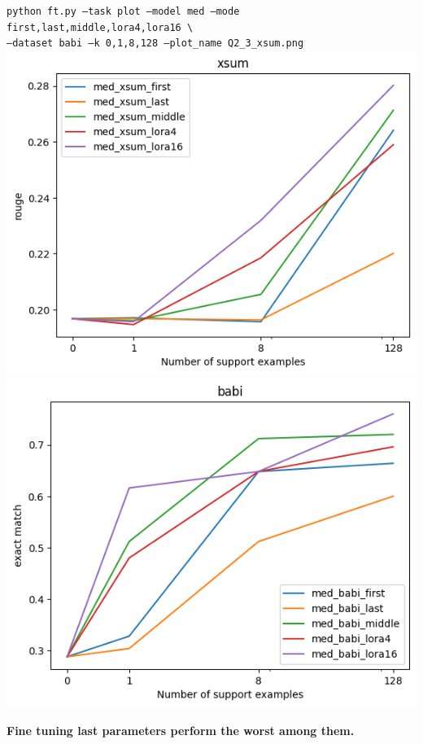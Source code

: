 \documentclass[12pt]{article}
\begin{document}
\begin{enumerate}
            {\small \texttt{python ft.py --task plot --model med --mode first,last,middle,lora4,lora16 \textbackslash \\
        \phantom{asdf}--dataset babi --k 0,1,8,128 --plot\_name Q2\_3\_xsum.png}}\\
        \includegraphics[width=\linewidth]{hw3_starter_code/starter_code/Q2_3_xsum.png}
        \includegraphics[width=\linewidth]{hw3_starter_code/starter_code/Q2_3_babi.png}

        \textbf{\color{red}Fine tuning last parameters perform the worst among them.}

    \end{enumerate}
\end{document}
